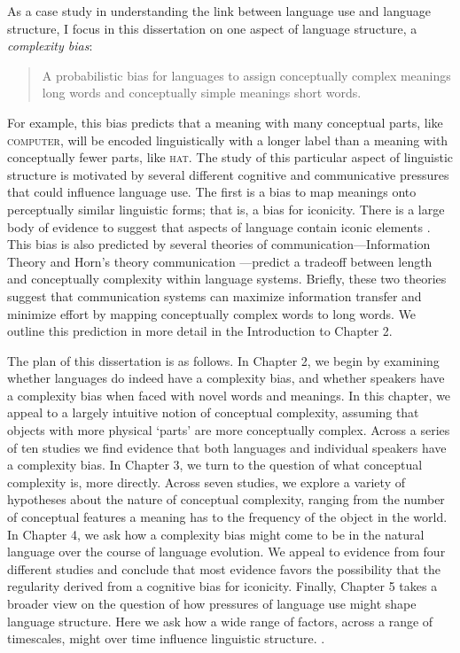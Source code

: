 As a case study in understanding the link between language use and language structure, I focus in this dissertation on one aspect of language structure,  a {\it complexity bias}:
\begin{quote}
A probabilistic bias for languages to assign conceptually complex meanings long words and conceptually simple meanings  short words.
\end{quote}
For example, this bias predicts that a meaning with many conceptual parts, like \textsc{computer}, will be encoded linguistically with a longer label than a meaning with conceptually fewer parts, like  \textsc{hat}. The study of this particular aspect of linguistic structure is motivated by several different cognitive and communicative pressures that could influence language use. The first is a bias to map meanings onto perceptually similar linguistic forms; that is, a bias for iconicity. There is a large body of evidence to suggest that aspects of language  contain iconic elements \cite{}. This bias is also predicted by several theories of communication---Information Theory  \cite{} and Horn's theory communication  \cite{}---predict a tradeoff between length and conceptually complexity within language systems. Briefly, these two theories suggest that communication systems can maximize information transfer and minimize effort by mapping conceptually complex words to long words. We outline this prediction in more detail in the Introduction to Chapter 2.

The plan of this dissertation is as follows. In Chapter 2, we begin by examining whether languages do indeed have a complexity bias, and whether speakers have a complexity bias when faced with novel words and meanings. In this chapter, we appeal to a largely intuitive notion of conceptual complexity, assuming that objects with more physical `parts' are more conceptually complex. Across a series of ten studies we find evidence  that both languages and individual speakers have a complexity bias. In Chapter 3, we turn to the question of what conceptual complexity is, more directly. Across seven studies, we explore a variety of hypotheses about the nature of conceptual complexity, ranging from the number of conceptual features a meaning has to the frequency of the object in the world. In Chapter 4, we ask how a complexity bias might come to be in the natural language over the course of language evolution. We appeal to evidence from four different studies and conclude that most evidence favors the possibility that the regularity derived from a cognitive bias for iconicity.  Finally, Chapter 5 takes a broader view on the question of how pressures of language use might shape language structure. Here we ask how a wide range of factors, across a range of timescales, might over time influence linguistic structure. 
.

